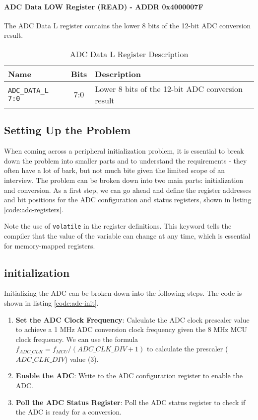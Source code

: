 \documentclass[main.tex]{subfiles}
\begin{document}
\paragraph{ADC Data LOW Register (READ) - ADDR 0x4000007F}
The ADC Data L register contains the lower 8 bits of the 12-bit ADC conversion result.
\begin{table}[h!]
    \centering
    \begin{tabular}{|l|c|p{10cm}|}
        \hline
        \textbf{Name} & \textbf{Bits} & \textbf{Description} \\ \hline
        \texttt{ADC\_DATA\_L 7:0} & 7:0 & Lower 8 bits of the 12-bit ADC conversion result \\ \hline
    \end{tabular}
    \caption{ADC Data L Register Description}
    \label{tab:adc_data_l_register}
\end{table}

\spoilerline

\subsection{Setting Up the Problem}
When coming across a peripheral initialization problem, it is essential to break down the problem into smaller parts and to understand the requirements - they often have a lot of bark, but not much bite given the limited scope of an interview. The problem can be broken down into two main parts: initialization and conversion. As a first step, we can go ahead and define the register addresses and bit positions for the ADC configuration and status registers, shown in listing \ref{code:adc-registers}.


\noindent Note the use of \texttt{volatile} in the register definitions. This keyword tells the compiler that the value of the variable can change at any time, which is essential for memory-mapped registers.

\subsection {initialization} 
Initializing the ADC can be broken down into the following steps. The code is shown in listing \ref{code:adc-init}.
\begin{enumerate}
    \item \textbf{Set the ADC Clock Frequency}: Calculate the ADC clock prescaler value to achieve a 1 MHz ADC conversion clock frequency given the 8 MHz MCU clock frequency. We can use the formula $f_{ADC\_CLK} = f_{MCU}/(ADC\_CLK\_DIV + 1)$ to calculate the prescaler ($ADC\_CLK\_DIV$) value (3).
    \item \textbf{Enable the ADC}: Write to the ADC configuration register to enable the ADC.
    \item \textbf{Poll the ADC Status Register}: Poll the ADC status register to check if the ADC is ready for a conversion.
\end{enumerate}
\end{document}
